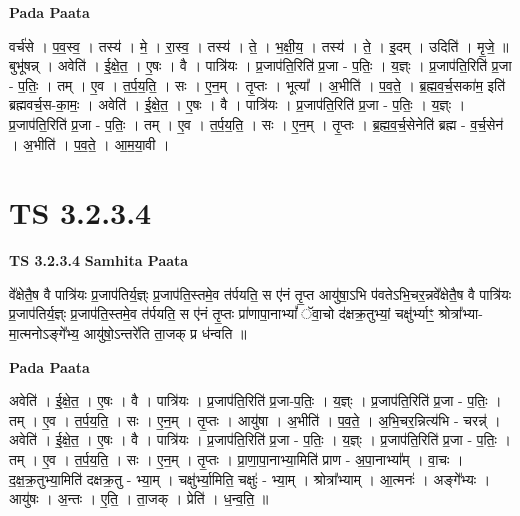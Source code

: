 \documentclass[17pt]{extarticle}
\begin{document}
\textbf{Pada Paata} \newline

वर्च॑से । प॒व॒स्व॒ । तस्य॑ । मे॒ । रा॒स्व॒ । तस्य॑ । ते॒ । भ॒क्षी॒य॒ । तस्य॑ । ते॒ । इ॒दम् । उदिति॑ । मृ॒जे॒ ॥ बुभू॑षन्न् । अवेति॑ । ई॒क्षे॒त॒ । ए॒षः । वै । पात्रि॑यः । प्र॒जाप॑ति॒रिति॑ प्र॒जा - प॒तिः॒ । य॒ज्ञ्ः । प्र॒जाप॑ति॒रिति॑ प्र॒जा - प॒तिः॒ । तम् । ए॒व । त॒र्प॒य॒ति॒ । सः । ए॒न॒म् । तृ॒प्तः । भूत्या᳚ । अ॒भीति॑ । प॒व॒ते॒ । ब्र॒ह्म॒व॒र्च॒सका॑म॒ इति॑ ब्रह्मवर्च॒स-का॒मः॒ । अवेति॑ । ई॒क्षे॒त॒ । ए॒षः । वै । पात्रि॑यः । प्र॒जाप॑ति॒रिति॑ प्र॒जा - प॒तिः॒ । य॒ज्ञ्ः । प्र॒जाप॑ति॒रिति॑ प्र॒जा - प॒तिः॒ । तम् । ए॒व । त॒र्प॒य॒ति॒ । सः । ए॒न॒म् । तृ॒प्तः । ब्र॒ह्म॒व॒र्च॒सेनेति॑ ब्रह्म - व॒र्च॒सेन॑ । अ॒भीति॑ । प॒व॒ते॒ । आ॒म॒या॒वी ।  \newline





\section{ TS 3.2.3.4 }

\textbf{TS 3.2.3.4 } \newline
\textbf{Samhita Paata} \newline

वे᳚क्षेतै॒ष वै पात्रि॑यः प्र॒जाप॑तिर्य॒ज्ञ्ः प्र॒जाप॑ति॒स्तमे॒व त॑र्पयति॒ स ए॑नं तृ॒प्त आयु॑षा॒ऽभि प॑वतेऽभि॒चर॒न्नवे᳚क्षेतै॒ष वै पात्रि॑यः प्र॒जाप॑तिर्य॒ज्ञ्ः प्र॒जाप॑ति॒स्तमे॒व त॑र्पयति॒ स ए॑नं तृ॒प्तः प्रा॑णापा॒नाभ्यां᳚ ॅवा॒चो द॑क्षक्र॒तुभ्यां॒ चक्षु॑र्भ्याꣳ॒॒ श्रोत्रा᳚भ्या-मा॒त्मनोऽङ्गे᳚भ्य॒ आयु॑षो॒ऽन्तरे॑ति ता॒जक् प्र ध॑न्वति ॥ \newline

\textbf{Pada Paata} \newline

अवेति॑ । ई॒क्षे॒त॒ । ए॒षः । वै । पात्रि॑यः । प्र॒जाप॑ति॒रिति॑ प्र॒जा-प॒तिः॒ । य॒ज्ञ्ः । प्र॒जाप॑ति॒रिति॑ प्र॒जा - प॒तिः॒ । तम् । ए॒व । त॒र्प॒य॒ति॒ । सः । ए॒न॒म् । तृ॒प्तः । आयु॑षा । अ॒भीति॑ । प॒व॒ते॒ । अ॒भि॒चर॒न्नित्य॑भि - चरन्न्॑ । अवेति॑ । ई॒क्षे॒त॒ । ए॒षः । वै । पात्रि॑यः । प्र॒जाप॑ति॒रिति॑ प्र॒जा - प॒तिः॒ । य॒ज्ञ्ः । प्र॒जाप॑ति॒रिति॑ प्र॒जा - प॒तिः॒ । तम् । ए॒व । त॒र्प॒य॒ति॒ । सः । ए॒न॒म् । तृ॒प्तः । प्रा॒णा॒पा॒नाभ्या॒मिति॑ प्राण - अ॒पा॒नाभ्या᳚म् । वा॒चः । द॒क्ष॒क्र॒तुभ्या॒मिति॑ दक्षक्र॒तु - भ्या॒म् । चक्षु॑र्भ्या॒मिति॒ चक्षुः॑ - भ्या॒म् । श्रोत्रा᳚भ्याम् । आ॒त्मनः॑ । अङ्गे᳚भ्यः । आयु॑षः । अ॒न्तः । ए॒ति॒ । ता॒जक् । प्रेति॑ । ध॒न्व॒ति॒ ॥  \newline
\end{document}
